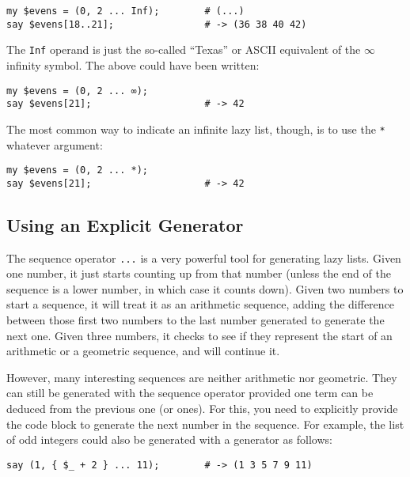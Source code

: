 \begin{verbatim}
my $evens = (0, 2 ... Inf);        # (...)
say $evens[18..21];                # -> (36 38 40 42)
\end{verbatim}

The {\tt Inf} operand is just the so-called ``Texas'' 
or ASCII equivalent of the $\infty$ infinity symbol. 
The above could have been written:

\begin{verbatim}
my $evens = (0, 2 ... ∞); 
say $evens[21];                    # -> 42
\end{verbatim} 

The most common way to indicate an infinite lazy list, though, 
is to use the \verb'*' whatever argument:

\begin{verbatim}
my $evens = (0, 2 ... *); 
say $evens[21];                    # -> 42
\end{verbatim} 

\subsection{Using an Explicit Generator}

The sequence operator \verb'...' is a very powerful tool 
for generating lazy lists. Given one number, it just 
starts counting up from that number (unless the 
end of the sequence is a lower number, 
in which case it counts down). Given two numbers 
to start a sequence, it will treat it as an arithmetic 
sequence, adding the difference between those first 
two numbers to the last number generated to generate 
the next one. Given three numbers, it checks to see 
if they represent the start of an arithmetic or a 
geometric sequence, and will continue it.

However, many interesting sequences are neither arithmetic 
nor geometric.  They can still be generated with the 
sequence operator provided one term can be deduced from 
the previous one (or ones). For this, you need to explicitly 
provide the code block to generate the next number in 
the sequence. For example, the list of odd integers 
could also be generated with a generator as follows:

\begin{verbatim}
say (1, { $_ + 2 } ... 11);        # -> (1 3 5 7 9 11)
\end{verbatim}

